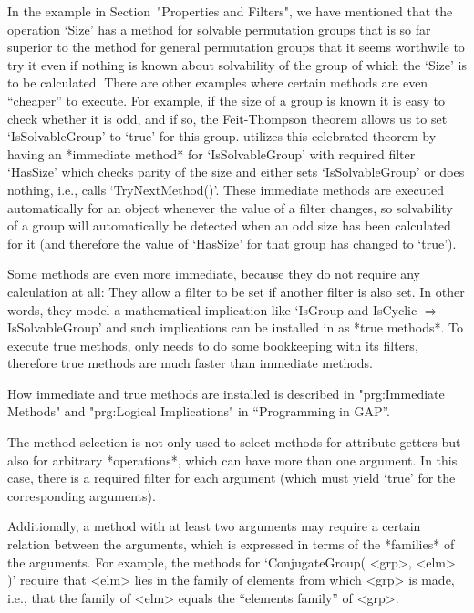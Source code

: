 %
In the example in Section~"Properties and Filters",
we have mentioned that the operation `Size' has a
method  for solvable permutation  groups that is  so  far superior to the
method for  general permutation groups that  it seems worthwile to try it
even if nothing  is  known about solvability   of the group of which  the
`Size' is to   be  calculated. There are   other  examples where  certain
methods  are even ``cheaper'' to  execute. For example,  if the size of a
group is known  it is easy to check  whether  it is  odd, and  if so, the
Feit-Thompson  theorem allows us to set  `IsSolvableGroup' to `true' for
this group.   {\GAP} utilizes   this  celebrated  theorem  by  having  an
*immediate  method* for `IsSolvableGroup'  with required filter `HasSize'
which checks parity of the size and either sets `IsSolvableGroup' or does
nothing, i.e.,   calls `TryNextMethod()'.   These immediate  methods  are
executed  automatically for an  object  whenever the   value of a  filter
changes, so solvability of a group will automatically be detected when an
odd size has been calculated for it (and therefore the value of `HasSize'
for that group has changed to `true').

Some methods are  even more immediate,   because they do not  require any
calculation  at all: They  allow a filter to  be set if another filter is
also set. In other words,   they  model a mathematical implication   like
`IsGroup   and   IsCyclic    $\Rightarrow$   IsSolvableGroup'  and   such
implications  can be installed  in {\GAP}  as  *true methods*. To execute
true methods, {\GAP} only needs to do  some bookkeeping with its filters,
therefore true methods are much faster than immediate methods.

How immediate and true methods are installed is described in 
"prg:Immediate Methods" and "prg:Logical Implications"
in ``Programming in GAP''.


\null

%
The method selection  is not only  used to  select  methods for attribute
getters but also for arbitrary *operations*, which can have more than one
argument.  In this case,   there is a   required filter for each argument
(which must yield `true'  for the corresponding  arguments).

Additionally, a method with at least two arguments may require a certain
relation between the arguments,
which is expressed in terms of the *families* of the arguments.
For example, the methods for  `ConjugateGroup( <grp>, <elm> )'
require that <elm>  lies in the family   of elements from  which <grp> is
made, i.e., that  the family of  <elm> equals the ``elements family''  of
<grp>.

